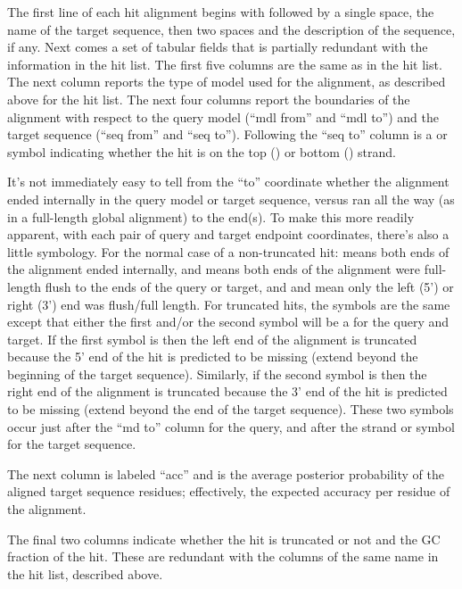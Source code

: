 The first line of each hit alignment begins with \ccode{>>} followed
by a single space, the name of the target sequence, then two spaces
and the description of the sequence, if any. Next comes a set of
tabular fields that is partially redundant with the information in the
hit list. The first five columns are the same as in the hit list. The
next column reports the type of model used for the alignment, as
described above for the hit list. The next four columns report the
boundaries of the alignment with respect to the query model (``mdl
from'' and ``mdl to'') and the target sequence (``seq from'' and ``seq
to''). Following the ``seq to'' column is a \ccode{+} or \ccode{-}
symbol indicating whether the hit is on the top (\ccode{+}) or bottom
(\ccode{-}) strand.

It's not immediately easy to tell from the ``to'' coordinate whether
the alignment ended internally in the query model or target sequence,
versus ran all the way (as in a full-length global alignment) to the
end(s). To make this more readily apparent, with each pair of query
and target endpoint coordinates, there's also a little symbology. For
the normal case of a non-truncated hit:  means both ends of
the alignment ended internally, and \prog{[]} means both ends of the
alignment were full-length flush to the ends of the query or target,
and \prog{[.}  and \prog{.]} mean only the left (5') or right (3') end
was flush/full length.  For truncated hits, the symbols are the same
except that either the first and/or the second symbol will be a
\prog{~} for the query and target. If the first symbol is \prog{~}
then the left end of the alignment is truncated because the 5' end of
the hit is predicted to be missing (extend beyond the beginning of the
target sequence). Similarly, if the second symbol is \prog{~} then the
right end of the alignment is truncated because the 3' end of the hit
is predicted to be missing (extend beyond the end of the target
sequence). These two symbols occur just after the ``md to'' column for
the query, and after the strand \ccode{+} or \ccode{-} symbol for the
target sequence.

The next column is labeled ``acc'' and is the average posterior
probability of the aligned target sequence residues; effectively, the
expected accuracy per residue of the alignment.

The final two columns indicate whether the hit is truncated or not and
the GC fraction of the hit. These are redundant with the columns of
the same name in the hit list, described above.

